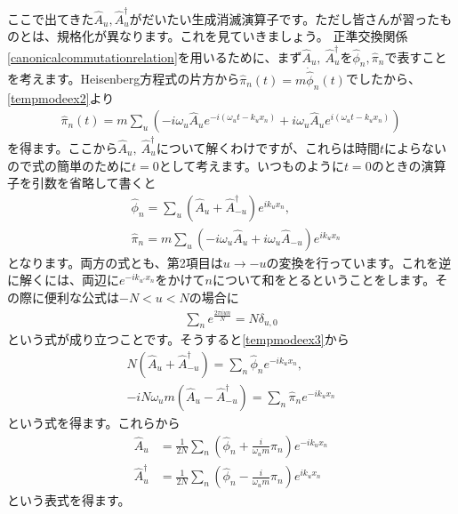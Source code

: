 \documentclass[report,paper=a4, fontsize=12pt, line_length=16cm, number_of_lines=33,dvipdfmx]{jlreq}
\numberwithin{equation}{chapter}
\newcommand{\phih}{\hat{\phi}}
\newcommand{\pih}{\hat{\pi}}
\newcommand{\Ah}{\widehat{A}}
\begin{document}
ここで出てきた$\Ah_u,\Ah_u^{\dag}$がだいたい生成消滅演算子です。ただし皆さんが習ったものとは、規格化が異なります。これを見ていきましょう。
正準交換関係\eqref{canonicalcommutationrelation}を用いるために、まず$\Ah_u,\ \Ah_u^{\dag}$を$\phih_n,\pih_n$で表すことを考えます。Heisenberg方程式の片方から$\pih_n(t)=m\dot{\phih}_n(t)$でしたから、\eqref{tempmodeex2}より
\begin{align}
  \pih_n(t)=m\sum_{u}(-i\omega_{u}\Ah_{u}e^{-i(\omega_u t-k_u x_n)}+i\omega_u\Ah_{u}e^{i(\omega_u t-k_u x_n)})
\end{align}
を得ます。ここから$\Ah_u,\ \Ah_u^{\dag}$について解くわけですが、これらは時間$t$によらないので式の簡単のために$t=0$として考えます。いつものように$t=0$のときの演算子を引数を省略して書くと
\begin{align}
  &\phih_n=\sum_{u}(\Ah_{u}+\Ah_{-u}^{\dag})e^{ik_u x_n},\\
  &\pih_n=m\sum_{u}(-i\omega_{u}\Ah_{u}+i\omega_u\Ah_{-u})e^{ik_u x_n}\label{tempmodeex3}
\end{align}
となります。両方の式とも、第2項目は$u\to -u$の変換を行っています。これを逆に解くには、両辺に$e^{-ik_{u'}x_n}$をかけて$n$について和をとるということをします。その際に便利な公式は$-N<u<N$の場合に
\begin{align}
  \sum_{n}e^{\frac{2\pi i u n}{N}}=N\delta_{u,0}
\end{align}
という式が成り立つことです。そうすると\eqref{tempmodeex3}から
\begin{align}
  N(\Ah_u+\Ah_{-u}^{\dag}) =\sum_{n}\phih_n e^{-ik_u x_n},\nonumber\\
  -iN\omega_{u}m(\Ah_u-\Ah_{-u}^{\dag})  =\sum_{n}\pih_n e^{-ik_u x_n}
\end{align}
という式を得ます。これらから
\begin{align}
  \Ah_u&=\frac{1}{2N}\sum_{n}(\phih_n+\frac{i}{\omega_u m}\pih_n)e^{-ik_ux_n}\nonumber\\
  \Ah_u^{\dag}&=\frac{1}{2N}\sum_{n}(\phih_n-\frac{i}{\omega_u m}\pih_n)e^{ik_ux_n}\label{tempmodeex4}
\end{align}
という表式を得ます。
\end{document}
